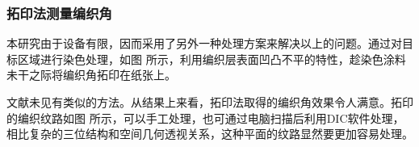 \subsubsection{拓印法测量编织角}
本研究由于设备有限，因而采用了另外一种处理方案来解决以上的问题。通过对目标区域进行染色处理，如图 所示，利用编织层表面凹凸不平的特性，趁染色涂料未干之际将编织角拓印在纸张上。

文献未见有类似的方法。从结果上来看，拓印法取得的编织角效果令人满意。拓印的编织纹路如图 所示，可以手工处理，也可通过电脑扫描后利用DIC软件处理，相比复杂的三位结构和空间几何透视关系，这种平面的纹路显然要更加容易处理。













